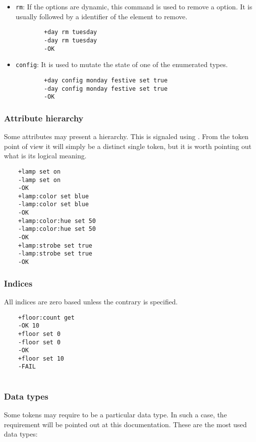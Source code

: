 \documentclass[../main.tex]{subfiles}
\begin{document}
\begin{itemize}
    \item \texttt{rm}: If the options are dynamic, this command is used to remove a option. It is usually followed by a identifier of the element to remove.
    
    \begin{lstlisting}
        +day rm tuesday
        -day rm tuesday
        -OK
    \end{lstlisting}
    
    \item \texttt{config}: It is used to mutate the state of one of the enumerated types.
    
    \begin{lstlisting}
        +day config monday festive set true
        -day config monday festive set true
        -OK
    \end{lstlisting}
    
    
\end{itemize}

\subsubsection{Attribute hierarchy}
Some attributes may present a hierarchy. This is signaled using \textquote{:}. From the token point of view it will simply be a distinct single token, but it is worth pointing out what is its logical meaning.

\begin{lstlisting}
    +lamp set on
    -lamp set on
    -OK
    +lamp:color set blue
    -lamp:color set blue
    -OK
    +lamp:color:hue set 50
    -lamp:color:hue set 50
    -OK
    +lamp:strobe set true
    -lamp:strobe set true
    -OK
\end{lstlisting}

\subsubsection{Indices}
All indices are zero based unless the contrary is specified.

\begin{lstlisting}
    +floor:count get
    -OK 10
    +floor set 0
    -floor set 0
    -OK
    +floor set 10
    -FAIL
    
\end{lstlisting}
    
\subsubsection{Data types}
Some tokens may require to be a particular data type. In such a case, the requirement will be pointed out at this documentation. These are the most used data types:
\end{document}
